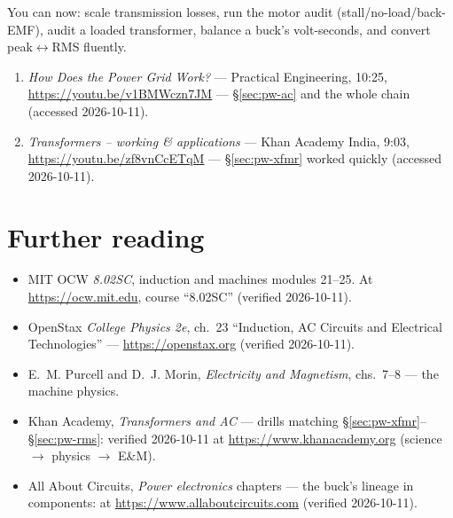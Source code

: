 \begin{wins}
You can now: scale transmission losses, run the motor audit
(stall/no-load/back-EMF), audit a loaded transformer, balance a buck's
volt-seconds, and convert peak$\leftrightarrow$RMS fluently.
\end{wins}


\begin{rulebox}
\begin{enumerate}
\item \emph{How Does the Power Grid Work?} --- Practical Engineering,
10:25, \url{https://youtu.be/v1BMWczn7JM} --- \S\ref{sec:pw-ac} and
the whole chain (accessed 2026-10-11).
\item \emph{Transformers -- working \& applications} --- Khan Academy
India, 9:03, \url{https://youtu.be/zf8vnCcETqM} ---
\S\ref{sec:pw-xfmr} worked quickly (accessed 2026-10-11).
\end{enumerate}
\end{rulebox}

\section*{Further reading}

\begin{itemize}
\item MIT OCW \emph{8.02SC}, induction and machines modules 21--25.
At \url{https://ocw.mit.edu}, course ``8.02SC'' (verified 2026-10-11).
\item OpenStax \emph{College Physics 2e}, ch.~23
``Induction, AC Circuits and Electrical Technologies'' ---
\url{https://openstax.org} (verified 2026-10-11).
\item E.~M. Purcell and D.~J. Morin, \emph{Electricity and Magnetism},
chs.~7--8 --- the machine physics.
\item Khan Academy, \emph{Transformers and AC} --- drills matching
\S\ref{sec:pw-xfmr}--\S\ref{sec:pw-rms}: verified 2026-10-11 at
\url{https://www.khanacademy.org} (science $\to$ physics $\to$ E\&M).
\item All About Circuits, \emph{Power electronics} chapters --- the
buck's lineage in components: at \url{https://www.allaboutcircuits.com}
(verified 2026-10-11).
\end{itemize}

